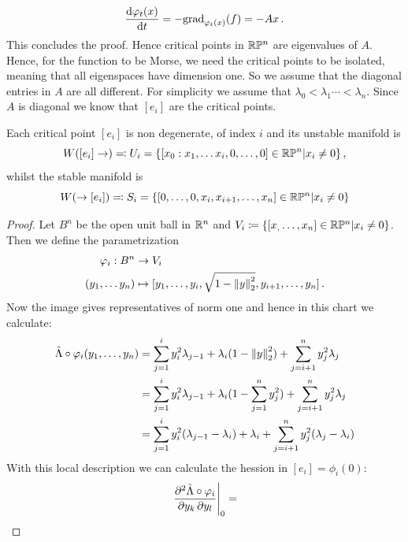 \begin{example}
		\begin{equation*}
			\frac{\mathop{}\!\mathrm{d} \varphi_t(x)}{\mathop{}\!\mathrm{d} t}=-\mathrm{grad}_{\varphi_t(x)}(f)=-Ax\,.
		\end{equation*} This concludes the proof.
		Hence critical points in $\mathbb{R}\mathbb{P}^n$ are eigenvalues of $A$. Hence, for the function to be Morse, we need the critical points to be isolated, meaning that all eigenspaces have dimension one. So we assume that the diagonal entries in $A$ are all different. For simplicity we assume that $\lambda_0<\lambda_1\cdots <\lambda_n$. Since $A$ is diagonal we know that $[e_i]$ are the critical points.
		\begin{lemma}\label{lem: unstable manifolds of real projective space}
			Each critical point $[e_i]$ is non degenerate, of index $i$ and its unstable manifold is
			\begin{equation*}
				W([e_i]\to)\eqcolon U_i=\{[x_0:x_1,\dots x_i,0,\dots,0]\in \mathbb{R}\mathbb{P}^n| x_i\neq 0\}\,,
			\end{equation*} whilst the stable manifold is
			\begin{equation*}
				W(\to [e_i])\eqcolon S_i=\{[0,\dots,0,x_i,x_{i+1},\dots,x_n]\in\mathbb{R}\mathbb{P}^n|x_i\neq 0\}
			\end{equation*}
		\end{lemma}
		\begin{proof}
			Let $B^n$ be the open unit ball in $\mathbb{R}^n$ and $V_i\coloneq \{[x_,\dots,x_n]\in\mathbb{R}\mathbb{P}^n|x_i\neq 0\}$. Then we define the parametrization
			\begin{align*}
				\varphi_i:B^n &\to V_i\\
				(y_1,\dots y_n)&\mapsto [y_1,\dots,y_i,\sqrt{1-\left\lVert y\right\rVert_2^2},y_{i+1},\dots,y_n]\,.
			\end{align*} Now the image gives representatives of norm one and hence in this chart we calculate:
			\begin{align*}
				\tilde{\Lambda}\circ \varphi_i(y_1,\dots,y_n)
				&= \sum_{j=1}^iy_i^2\lambda_{j-1}+\lambda_i({1-\left\lVert y\right\rVert_2^2})+\sum_{j=i+1}^n y_j^2\lambda_j\\
				&= \sum_{j=1}^iy_i^2\lambda_{j-1}+\lambda_i(1-\sum_{j=1}^n y_j^2 )+\sum_{j=i+1}^n y_j^2\lambda_j \\
				&= \sum_{j=1}^iy_i^2(\lambda_{j-1}-\lambda_i)+\lambda_i+\sum_{j=i+1}^n y_j^2(\lambda_j-\lambda_i)
			\end{align*} With this local description we can calculate the hession in $[e_i]=\phi_i(0)$:
			\begin{equation*}
				\restr{\frac{\partial ^2\tilde{\Lambda}\circ \phi_i}{\partial y_k \, \partial y_l}}{0}=

\end{equation*}
\end{proof}
\end{example}

